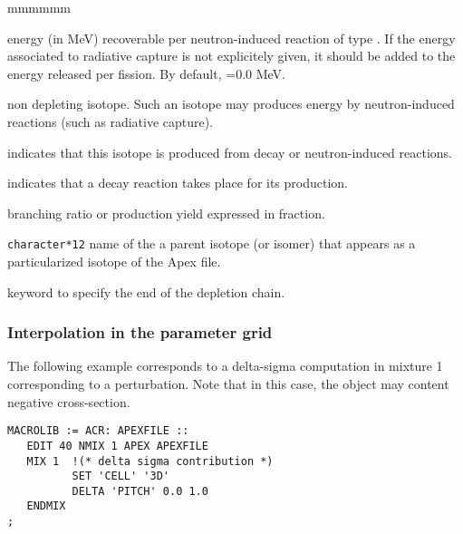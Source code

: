 \begin{ListeDeDescription}{mmmmmm}
\item[\dusa{energy}] energy (in MeV) recoverable per neutron-induced
reaction of type . If the energy associated to radiative capture
is not explicitely given, it should be added to the energy released per fission. By
default, =0.0 MeV.

\item[\moc{STABLE}] non depleting isotope. Such an isotope may produces
energy by neutron-induced reactions (such as radiative capture).

\item[\moc{FROM}] indicates that this isotope is produced from decay or
neutron-induced reactions.

\item[\moc{DECAY}] indicates that a decay reaction takes place for its
production.

\item[\dusa{yield}] branching ratio or production yield expressed in fraction.

\item[\dusa{NAMPAR}] {\tt character*12} name of the a parent isotope
(or isomer) that appears as a particularized isotope of the Apex file.

\item[\moc{ENDCHAIN}] keyword to specify the end of the depletion chain.

\end{ListeDeDescription}


\subsubsection{Interpolation in the parameter grid}

The following example corresponds to a delta-sigma computation in mixture 1 corresponding to a perturbation. Note that in this case, the  object  may content negative cross-section. 
\begin{verbatim}
MACROLIB := ACR: APEXFILE ::
   EDIT 40 NMIX 1 APEX APEXFILE
   MIX 1  !(* delta sigma contribution *)
          SET 'CELL' '3D'
          DELTA 'PITCH' 0.0 1.0
   ENDMIX
;
\end{verbatim}

\clearpage
